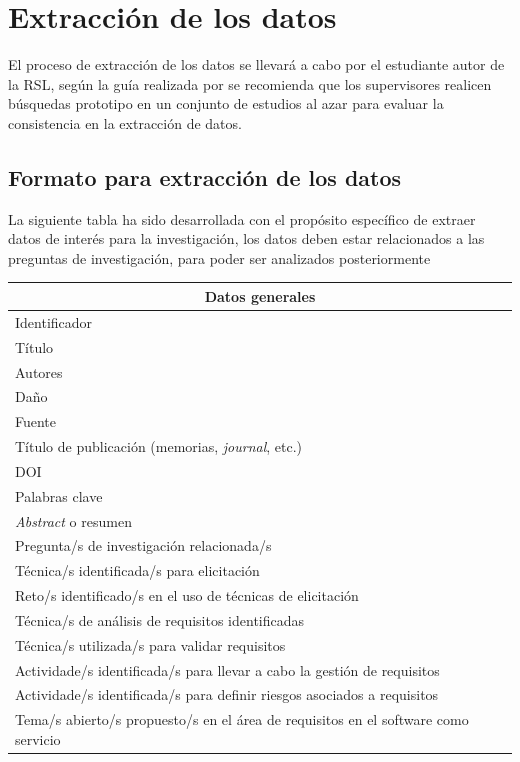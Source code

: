 \documentclass{article}
\begin{document}
\newpage

\section{Extracción de los datos}
El proceso de extracción de los datos se llevará a cabo por el estudiante autor de la RSL, según la guía realizada por
\cite{kitchenham2007guidelines} se recomienda que los supervisores realicen búsquedas prototipo en un conjunto de estudios al azar para evaluar la consistencia
en la extracción de datos.

\subsection{Formato para extracción de los datos}
La siguiente tabla ha sido desarrollada con el propósito específico de extraer datos de interés para la investigación, 
los datos deben estar relacionados a las preguntas de investigación, para poder ser analizados posteriormente 

\begin{center}
\begin{tabular}{ |l|l| }
\hline
\multicolumn{2}{|c|}{Datos generales} \\
  \hline
    Identificador &       \\
    \hline
    Título & \\
    \hline
    Autores &\\
    \hline
    Daño & \\
    \hline
    Fuente & \\
    \hline
    Título de publicación (memorias, \emph{journal}, etc.) & \\
    \hline
    DOI & \\
    \hline
    Palabras clave & \\
    \hline
    \emph{Abstract} o resumen & \\
    \hline
    Pregunta/s de investigación relacionada/s & \\
    \hline
    Técnica/s identificada/s para elicitación& \\
    \hline
    Reto/s identificado/s en el uso de técnicas de elicitación& \\
    \hline
    Técnica/s de análisis de requisitos identificadas& \\
    \hline
    Técnica/s utilizada/s para validar requisitos & \\
    \hline
    Actividade/s identificada/s para llevar a cabo la gestión de requisitos& \\
    \hline
    Actividade/s identificada/s para definir riesgos asociados a requisitos& \\
    \hline
    Tema/s abierto/s propuesto/s en el área de requisitos en el software como servicio& \\
    \hline
 \hline
\end{tabular}
\end{center}
\end{document}
